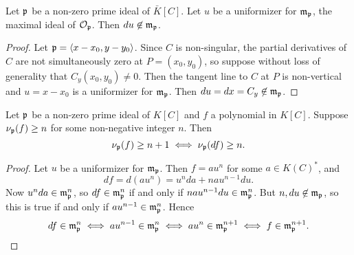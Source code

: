 \begin{lemma}
  \label{lem_differential_of_uniformizer}
  Let $\frak p$ be a non-zero prime ideal of $\bar K[C]$.
  Let $u$ be a uniformizer for $\frak m_{\frak p}$, the maximal ideal of $\cal O_{\frak p}$.
  Then $du \not \in \frak m_{\frak p}$.
\end{lemma}
\begin{proof}
  Let $\frak p = \pid{x - x_0, y - y_0}$.
  Since $C$ is non-singular, the partial derivatives of $C$ are not simultaneously zero at $P = (x_0, y_0)$,
  so suppose without loss of generality that $C_y(x_0, y_0) \neq 0$.
  Then the tangent line to $C$ at $P$ is non-vertical and $u = x - x_0$ is a uniformizer for $\frak m_{\frak p}$.
  Then $du = dx = C_y \not\in \frak m_{\frak p}$.
\end{proof}
\begin{theorem}
  \label{thm_differential_increases_order}
  Let $\frak p$ be a non-zero prime ideal of $K[C]$ and $f$ a polynomial in $K[C]$.
  Suppose $\nu_{\frak p}(f) \geq n$ for some non-negative integer $n$. Then
  \[ \nu_{\frak p}(f) \geq n + 1 \iff \nu_{\frak p}(df) \geq n. \]
\end{theorem}
\begin{proof}
  Let $u$ be a uniformizer for $\frak m_{\frak p}$.
  Then $f = au^n$ for some $a \in K(C)^*$, and
  \[ df = d(au^n) = u^nda + nau^{n-1}du. \]
  Now $u^nda \in \frak m_{\frak p}^n$,
  so $df \in \frak m_{\frak p}^n$ if and only if $nau^{n-1}du \in \frak m_{\frak p}^n$.
  But $n, du \not\in \frak m_{\frak p}$,
  so this is true if and only if $au^{n-1} \in \frak m_{\frak p}^n$. Hence
  \[ df \in \frak m_{\frak p}^n
    \iff au^{n-1} \in \frak m_{\frak p}^n
    \iff au^n \in \frak m_{\frak p}^{n+1}
    \iff f \in \frak m_{\frak p}^{n+1}. \qedhere \]
\end{proof}
